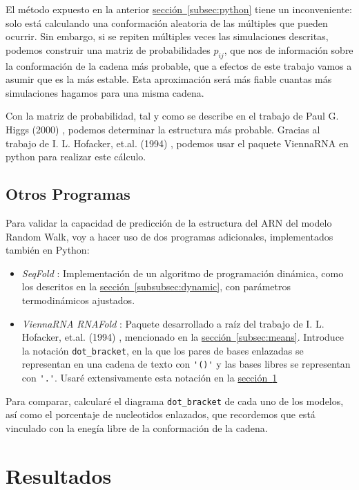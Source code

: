 \documentclass[a4paper,11pt,titlepage]{article}
\newcommand{\nr}[2][sección]{\hyperref[#2]{#1~\ref{#2}}}
\theoremstyle{definition}
\begin{document}
El método expuesto en la anterior \nr[sección]{subsec:python} tiene un inconveniente: solo está calculando una conformación aleatoria de las múltiples que pueden ocurrir. Sin embargo, si se repiten múltiples veces las simulaciones descritas, podemos construir una matriz de probabilidades $p_{ij}$, que nos de información sobre la conformación de la cadena más probable, que a efectos de este trabajo vamos a asumir que es la más estable. Esta aproximación será más fiable cuantas más simulaciones hagamos para una misma cadena.

Con la matriz de probabilidad, tal y como se describe en el trabajo de Paul G. Higgs (2000) \cite{phiggs}, podemos determinar la estructura más probable. Gracias al trabajo de I. L. Hofacker, et.al. (1994) \cite{hofacker}, podemos usar el paquete ViennaRNA en python para realizar este cálculo.

\subsection{Otros Programas}\label{subsec:packages}

Para validar la capacidad de predicción de la estructura del ARN del modelo Random Walk, voy a hacer uso de dos programas adicionales, implementados también en Python:

\begin{itemize}
    \item \textit{SeqFold} \cite{seqfold}: Implementación de un algoritmo de programación dinámica, como los descritos en la \nr[sección]{subsubsec:dynamic}, con parámetros termodinámicos ajustados.
    \item \textit{ViennaRNA RNAFold} \cite{viennarna}: Paquete desarrollado a raíz del trabajo de  I. L. Hofacker, et.al. (1994) \cite{hofacker}, mencionado en la \nr[sección]{subsec:means}. Introduce la notación \verb|dot_bracket|, en la que los pares de bases enlazadas se representan en una cadena de texto con \verb|'()'| y las bases libres se representan con \verb|'.'|. Usaré extensivamente esta notación en la \nr[sección]{sec:res}
\end{itemize}

Para comparar, calcularé el diagrama \verb|dot_bracket| de cada uno de los modelos, así como el porcentaje de nucleotidos enlazados, que recordemos que está vinculado con la enegía libre de la conformación de la cadena.


\section{Resultados}\label{sec:res}
\end{document}
